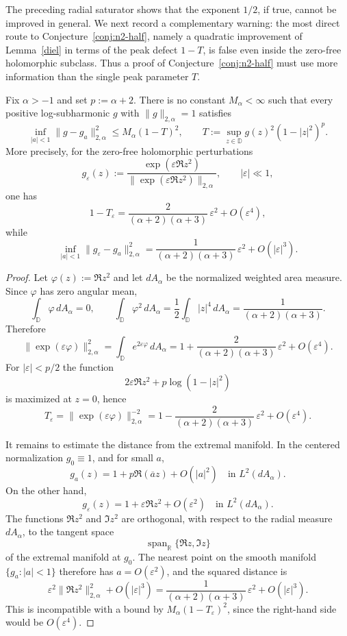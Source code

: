 \documentclass[a4paper,10pt]{amsart}
\newcommand{\D}{\mathbb{D}}
\begin{document}
The preceding radial saturator shows that the exponent $1/2$, if true, cannot
be improved in general. We next record a complementary warning: the most direct
route to Conjecture~\ref{conj:n2-half}, namely a quadratic improvement of
Lemma~\ref{diel} in terms of the peak defect $1-T$, is false even inside the
zero-free holomorphic subclass. Thus a proof of Conjecture~\ref{conj:n2-half}
must use more information than the single peak parameter $T$.

\begin{numprop}\label{prop:quadratic-diel-fails}
Fix $\alpha>-1$ and set $p:=\alpha+2$. There is no constant $M_\alpha<\infty$
such that every positive log-subharmonic $g$ with $\|g\|_{2,\alpha}=1$ satisfies
\[
\inf_{|a|<1}\|g-g_a\|_{2,\alpha}^2
\le
M_\alpha(1-T)^2,
\qquad
T:=\sup_{z\in\D}g(z)^2(1-|z|^2)^p.
\]
More precisely, for the zero-free holomorphic perturbations
\[
g_\varepsilon(z):=\frac{\exp(\varepsilon\Re z^2)}
{\|\exp(\varepsilon\Re z^2)\|_{2,\alpha}},
\qquad |\varepsilon|\ll1,
\]
one has
\[
1-T_\varepsilon
=
\frac{2}{(\alpha+2)(\alpha+3)}\,\varepsilon^2+O(\varepsilon^4),
\]
while
\[
\inf_{|a|<1}\|g_\varepsilon-g_a\|_{2,\alpha}^2
=
\frac{1}{(\alpha+2)(\alpha+3)}\,\varepsilon^2+O(|\varepsilon|^3).
\]
\end{numprop}

\begin{proof}
Let $\varphi(z):=\Re z^2$ and let $dA_\alpha$ be the normalized weighted area
measure. Since $\varphi$ has zero angular mean,
\[
\int_\D \varphi\,dA_\alpha=0,
\qquad
\int_\D \varphi^2\,dA_\alpha
=\frac12\int_\D |z|^4\,dA_\alpha
=\frac{1}{(\alpha+2)(\alpha+3)}.
\]
Therefore
\[
\|\exp(\varepsilon\varphi)\|_{2,\alpha}^2
=
\int_\D e^{2\varepsilon\varphi}\,dA_\alpha
=
1+
\frac{2}{(\alpha+2)(\alpha+3)}\,\varepsilon^2
+O(\varepsilon^4).
\]
For $|\varepsilon|<p/2$ the function
\[
2\varepsilon\Re z^2+p\log(1-|z|^2)
\]
is maximized at $z=0$, hence
\[
T_\varepsilon
=\|\exp(\varepsilon\varphi)\|_{2,\alpha}^{-2}
=
1-\frac{2}{(\alpha+2)(\alpha+3)}\,\varepsilon^2+O(\varepsilon^4).
\]

It remains to estimate the distance from the extremal manifold. In the centered
normalization $g_0\equiv1$, and for small $a$,
\[
g_a(z)=1+p\Re(\overline a z)+O(|a|^2)
\quad\text{in }L^2(dA_\alpha).
\]
On the other hand,
\[
g_\varepsilon(z)=1+\varepsilon\Re z^2+O(\varepsilon^2)
\quad\text{in }L^2(dA_\alpha).
\]
The functions $\Re z^2$ and $\Im z^2$ are orthogonal, with respect to the radial
measure $dA_\alpha$, to the tangent space
\[
\operatorname{span}_{\mathbb R}\{\Re z,\Im z\}
\]
of the extremal manifold at $g_0$. The nearest point on the smooth manifold
$\{g_a:|a|<1\}$ therefore has $a=O(\varepsilon^2)$, and the squared distance is
\[
\varepsilon^2\|\Re z^2\|_{2,\alpha}^2+O(|\varepsilon|^3)
=
\frac{1}{(\alpha+2)(\alpha+3)}\,\varepsilon^2+O(|\varepsilon|^3).
\]
This is incompatible with a bound by $M_\alpha(1-T_\varepsilon)^2$, since the
right-hand side would be $O(\varepsilon^4)$.
\end{proof}
\end{document}
